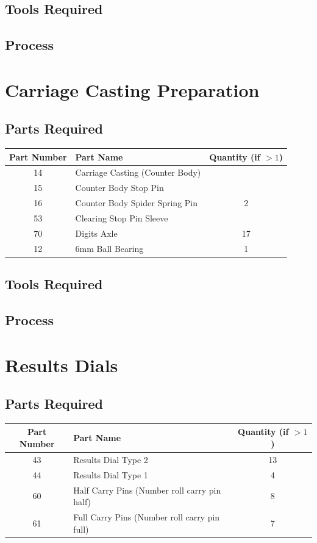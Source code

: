 \documentclass{article}
\begin{document}
\subsection{Tools Required}

\subsection{Process}


\newpage
\section{Carriage Casting Preparation}
\subsection{Parts Required}
\begin{table}[h!]
	\centering
	\begin{tabular}{clc}
		Part Number & Part Name & Quantity (if $>1$) \\ \hline
		14 & Carriage Casting (Counter Body) & \\
		15 & Counter Body Stop Pin & \\
		16 & Counter Body Spider Spring Pin & 2 \\
		53 & Clearing Stop Pin Sleeve & \\
		70 & Digits Axle & 17 \\ \hline \hline
		12 & 6mm Ball Bearing & 1
	\end{tabular}
\end{table}

\subsection{Tools Required}

\subsection{Process}



\newpage
\section{Results Dials}
\subsection{Parts Required}

\begin{table}[h!]
	\centering
	\begin{tabular}{clc}
		Part Number & Part Name & Quantity (if $>1$) \\ \hline
		43 & Results Dial Type 2 & 13 \\
		44 & Results Dial Type 1 & 4 \\
		60 & Half Carry Pins (Number roll carry pin half) & 8\\
		61 & Full Carry Pins (Number roll carry pin full) & 7
	\end{tabular}
\end{table}
\end{document}
